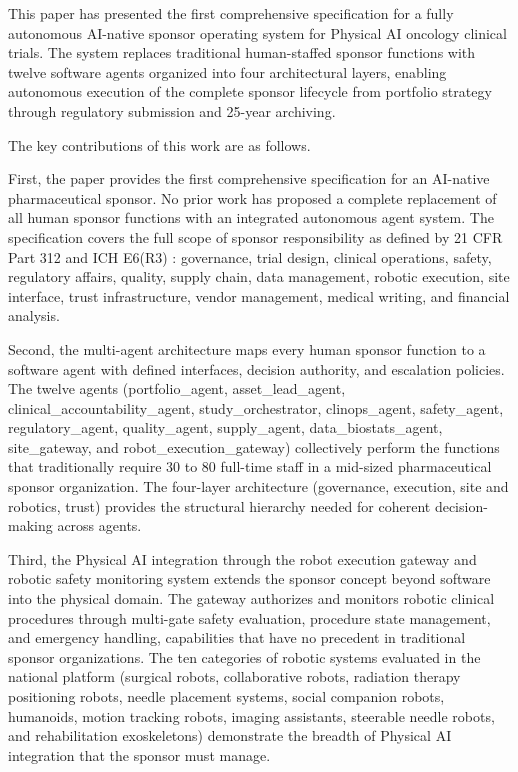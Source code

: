 
This paper has presented the first comprehensive specification for a fully autonomous
AI-native sponsor operating system for Physical AI oncology clinical trials. The system
replaces traditional human-staffed sponsor functions with twelve software agents organized
into four architectural layers, enabling autonomous execution of the complete sponsor
lifecycle from portfolio strategy through regulatory submission and 25-year archiving.

The key contributions of this work are as follows.

First, the paper provides the first comprehensive specification for an AI-native
pharmaceutical sponsor. No prior work has proposed a complete replacement of all human
sponsor functions with an integrated autonomous agent system. The specification covers
the full scope of sponsor responsibility as defined by 21 CFR Part 312 \cite{cfr-part-312}
and ICH E6(R3) \cite{ich-e6r3}: governance, trial design, clinical operations, safety,
regulatory affairs, quality, supply chain, data management, robotic execution, site
interface, trust infrastructure, vendor management, medical writing, and financial
analysis.

Second, the multi-agent architecture maps every human sponsor function to a software agent
with defined interfaces, decision authority, and escalation policies. The twelve agents
(portfolio\_agent, asset\_lead\_agent, clinical\_accountability\_agent, study\_orchestrator,
clinops\_agent, safety\_agent, regulatory\_agent, quality\_agent, supply\_agent,
data\_biostats\_agent, site\_gateway, and robot\_execution\_gateway) collectively perform the
functions that traditionally require 30 to 80 full-time staff in a mid-sized pharmaceutical
sponsor organization. The four-layer architecture (governance, execution, site and robotics,
trust) provides the structural hierarchy needed for coherent decision-making across
agents.

Third, the Physical AI integration through the robot execution gateway and robotic safety
monitoring system extends the sponsor concept beyond software into the physical domain. The
gateway authorizes and monitors robotic clinical procedures through multi-gate safety
evaluation, procedure state management, and emergency handling, capabilities that have
no precedent in traditional sponsor organizations. The ten categories of robotic systems
evaluated in the national platform (surgical robots, collaborative robots, radiation therapy
positioning robots, needle placement systems, social companion robots, humanoids, motion
tracking robots, imaging assistants, steerable needle robots, and rehabilitation
exoskeletons) demonstrate the breadth of Physical AI integration that the sponsor must
manage.

